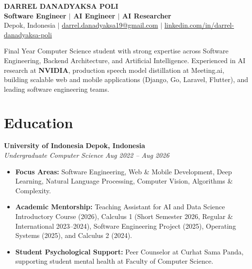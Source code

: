 \documentclass[letterpaper,10pt]{article}
\begin{document}

\begin{center}
    {\Huge \bfseries DARREL DANADYAKSA POLI} \\[4pt]
    \small \textbf{Software Engineer $|$ AI Engineer $|$ AI Researcher} \\[2pt]
    Depok, Indonesia \quad $|$ \quad 
    \href{mailto:darrel.danadyaksa19@gmail.com}{darrel.danadyaksa19@gmail.com} \quad $|$ \quad 
    \href{https://www.linkedin.com/in/darrel-danadyaksa-poli/}{linkedin.com/in/darrel-danadyaksa-poli}
\end{center}
\vspace{-5pt}

\begin{center}
    \parbox{0.98\textwidth}{\small \centering
    Final Year Computer Science student with strong expertise across Software Engineering, Backend Architecture, and Artificial Intelligence. Experienced in AI research at \textbf{NVIDIA}, production speech model distillation at Meeting.ai, building scalable web and mobile applications (Django, Go, Laravel, Flutter), and leading software engineering teams.
    }
\end{center}
\vspace{-5pt}

\section{Education}
\vspace{1pt}

\noindent \textbf{\large University of Indonesia} \hfill \textbf{Depok, Indonesia} \\
\textit{Undergraduate Computer Science} \hfill \textit{Aug 2022 -- Aug 2026}
\begin{itemize}
    \item \textbf{Focus Areas:} Software Engineering, Web \& Mobile Development, Deep Learning, Natural Language Processing, Computer Vision, Algorithms \& Complexity.
    \item \textbf{Academic Mentorship:} Teaching Assistant for AI and Data Science Introductory Course (2026), Calculus 1 (Short Semester 2026, Regular \& International 2023--2024), Software Engineering Project (2025), Operating Systems (2025), and Calculus 2 (2024).
    \item \textbf{Student Psychological Support:} Peer Counselor at Curhat Sama Panda, supporting student mental health at Faculty of Computer Science.
\end{itemize}
\vspace{2pt}
\end{document}
